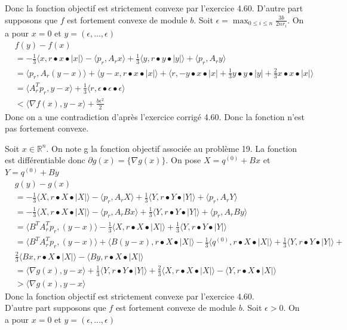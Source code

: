 \documentclass[12pt, letterpaper]{article}
\newcommand{\R}{\mathbb{R}^n}
\begin{document}
Donc la fonction objectif est strictement convexe par l'exercice 4.60. 
D'autre part supposons que $f$ est fortement convexe de module $b$. Soit $\epsilon =  \max_{0\leq i \leq n} \frac{3b}{2nr_i}$. On a pour $x = 0$ et $y = (\epsilon,...,\epsilon)$
\begin{align*}
&f(y) - f(x) \\
&= -\frac{1}{3} \langle x,r \bullet x \bullet |x|\rangle  - \langle p_r,A_rx\rangle  + \frac{1}{3}\langle y,r \bullet y \bullet |y|\rangle  + \langle p_r,A_ry\rangle   \\
&= \langle p_r,A_r(y - x)\rangle  + \langle y-x, r \bullet x \bullet |x|\rangle  + \langle r, -y \bullet x \bullet |x| + \frac{1}{3}y \bullet y \bullet |y| + \frac{2}{3}x \bullet x \bullet |x|\rangle \\
&= \langle A_r^Tp_r,y-x\rangle   + \frac{1}{3}\langle r, \epsilon \bullet \epsilon \bullet \epsilon\rangle  \\
&<  \langle \nabla f(x),y-x\rangle  + \frac{b \epsilon^2}{2}
\end{align*}
Donc on a une contradiction d'après l'exercice corrigé 4.60. Donc la fonction n'est pas fortement convexe.

Soit $x\in\R$. On note g la fonction objectif associée au problème 19. La fonction est différentiable donc $\partial g(x) = \{\nabla g(x)\}$. On pose $X = q^{(0)} + Bx$ et $Y = q^{(0)} + By$
\begin{align*}
&g(y) - g(x) \\
&= -\frac{1}{3} \langle X,r \bullet X \bullet |X|\rangle  - \langle p_r,A_rX\rangle  + \frac{1}{3}\langle Y,r \bullet Y \bullet |Y|\rangle  + \langle p_r,A_rY\rangle   \\
&= -\frac{1}{3} \langle X,r \bullet X \bullet |X|\rangle  - \langle p_r,A_rBx\rangle  + \frac{1}{3}\langle Y,r \bullet Y \bullet |Y|\rangle  + \langle p_r,A_rBy\rangle   \\
&= \langle B^TA_r^Tp_r,(y - x)\rangle -\frac{1}{3} \langle X,r \bullet X \bullet |X|\rangle + \frac{1}{3}\langle Y,r \bullet Y \bullet |Y|\rangle \\
&= \langle B^TA_r^Tp_r,(y - x)\rangle + \langle B(y-x),r \bullet X \bullet |X|\rangle - \frac{1}{3}\langle q^{(0)},r \bullet X \bullet |X|\rangle + \frac{1}{3}\langle Y,r \bullet Y \bullet |Y|\rangle + \\
&\frac{2}{3} \langle Bx,r \bullet X \bullet |X|\rangle -  \langle By,r \bullet X \bullet |X|\rangle\\
&=  \langle \nabla g(x),y-x\rangle + \frac{1}{3}\langle Y,r \bullet Y \bullet |Y|\rangle + \frac{2}{3} \langle X,r \bullet X \bullet |X|\rangle -  \langle Y,r \bullet X \bullet |X|\rangle \\
&> \langle \nabla g(x),y-x\rangle \tag{Par le lemme du début}
\end{align*}
Donc la fonction objectif est strictement convexe par l'exercice 4.60. \\
D'autre part supposons que $f$ est fortement convexe de module $b$. Soit $\epsilon>0$. On a pour $x = 0$ et $y = (\epsilon,...,\epsilon)$
\end{document}
